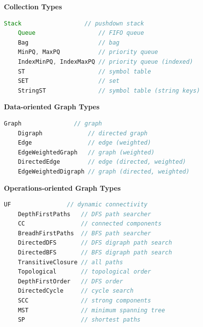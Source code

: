 \documentclass[8pt,a4paper,compress]{beamer}
\begin{document}
\begin{frame}[fragile]
\pause

\textbf{Collection Types}
\begin{lstlisting}[language=Java]
    Stack                  // pushdown stack
    Queue                  // FIFO queue
    Bag                    // bag
    MinPQ, MaxPQ           // priority queue
    IndexMinPQ, IndexMaxPQ // priority queue (indexed)
    ST                     // symbol table
    SET                    // set
    StringST               // symbol table (string keys)
\end{lstlisting}

\pause
\smallskip

\textbf{Data-oriented Graph Types}
\begin{lstlisting}[language=Java]
    Graph               // graph
    Digraph             // directed graph
    Edge                // edge (weighted)
    EdgeWeightedGraph   // graph (weighted)
    DirectedEdge        // edge (directed, weighted)
    EdgeWeightedDigraph // graph (directed, weighted)
\end{lstlisting}

\pause
\smallskip

\textbf{Operations-oriented Graph Types}
\begin{lstlisting}[language=Java]
    UF                // dynamic connectivity
    DepthFirstPaths   // DFS path searcher
    CC                // connected components
    BreadhFirstPaths  // BFS path searcher
    DirectedDFS       // DFS digraph path search
    DirectedBFS       // BFS digraph path search
    TransitiveClosure // all paths
    Topological       // topological order
    DepthFirstOrder   // DFS order
    DirectedCycle     // cycle search
    SCC               // strong components
    MST               // minimum spanning tree
    SP                // shortest paths
\end{lstlisting}
\end{frame}
\end{document}
